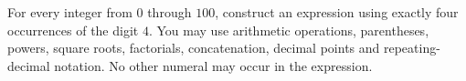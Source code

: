 For every integer from $0$ through $100$, construct an expression using exactly four occurrences of the digit $4$. You may use arithmetic operations, parentheses, powers, square roots, factorials, concatenation, decimal points and repeating-decimal notation. No other numeral may occur in the expression.
